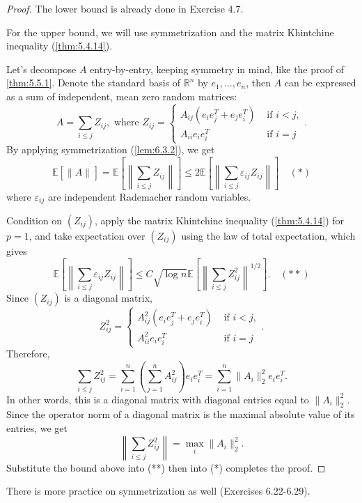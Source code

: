 \begin{proof}
The lower bound is already done in Exercise 4.7.

For the upper bound, we will use symmetrization and the matrix Khintchine inequality (\cref{thm:5.4.14}). 

Let's decompose $A$ entry-by-entry, keeping symmetry in mind, like the proof of \cref{thm:5.5.1}. Denote the 
standard basis of $\mathbb{R}^n$ by $e_1, \dots, e_n$, then $A$ can be expressed as a sum of independent, 
mean zero random matrices:
\[ A = \sum_{i \leq j}^{} Z_{ij}, \text{ where } Z_{ij} = \begin{cases}
	A_{ij}(e_i e_j^T + e_j e_i^T) &\text{ if } i < j, \\
	A_{ii}e_i e_i^T &\text{ if } i = j
\end{cases}. \]
By applying symmetrization (\cref{lem:6.3.2}), we get 
\[ \mathbb{E}\left[ \lVert A \rVert_{} \right] 
= \mathbb{E}\left[ \left\lVert \sum_{i \leq j}^{} Z_{ij} \right\rVert \right] 
\leq 2 \mathbb{E}\left[ \left\lVert \sum_{i \leq j}^{} \varepsilon_{ij} Z_{ij} \right\rVert \right] 
\quad (*) \]
where $\varepsilon_{ij}$ are independent Rademacher random variables.

Condition on $(Z_{ij})$, apply the matrix Khintchine inequality (\cref{thm:5.4.14}) for $p = 1$, and take 
expectation over $(Z_{ij})$ using the law of total expectation, which gives 
\[ \mathbb{E}\left[ \left\lVert \sum_{i \leq j}^{} \varepsilon_{ij} Z_{ij} \right\rVert \right] 
\leq C \sqrt{\log_{}{n}}\mathbb{E}\left[ \left\lVert \sum_{i \leq j}^{}Z_{ij}^2 \right\rVert^{1/2} \right]. 
\quad (**) \]
Since $(Z_{ij})$ is a diagonal matrix, 
\[ Z_{ij}^2 = \begin{cases}
	A_{ij}^2 (e_i e_j^T + e_je_i^T) &\text{ if } i < j, \\
	A_{ii}^2 e_i e_i^T &\text{ if } i = j
\end{cases}. \]
Therefore, 
\[ \sum_{i \leq j}^{} Z_{ij}^2 
= \sum_{i = 1}^{n} \left( \sum_{j = 1}^{n} A_{ij}^2 \right) e_ie_i^T 
= \sum_{i = 1}^{n} \lVert A_i \rVert_{2}^2 e_i e_i^T. \]
In other words, this is a diagonal matrix with diagonal entries equal to $\lVert A_i \rVert_{2}^2$. Since 
the operator norm of a diagonal matrix is the maximal absolute value of its entries, we get 
\[ \left\lVert \sum_{i \leq j}^{} Z_{ij}^2 \right\rVert = \max_{i} \lVert A_i \rVert_{2}^2. \]
Substitute the bound above into (**) then into (*) completes the proof.
\end{proof}

There is more practice on symmetrization as well (Exercises 6.22-6.29).



